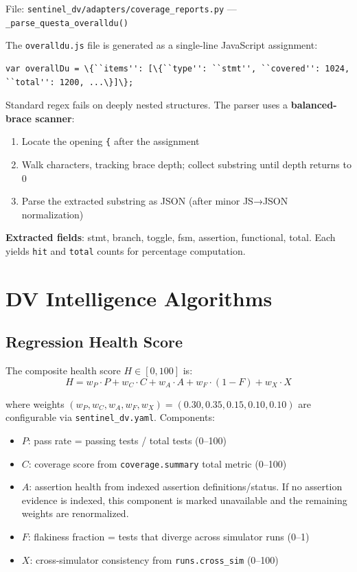 \documentclass[11pt,a4paper]{article}
\begin{document}
File: \texttt{sentinel\_dv/adapters/coverage\_reports.py} — \texttt{\_parse\_questa\_overalldu()}

The \texttt{overalldu.js} file is generated as a single-line JavaScript assignment:
\begin{lstlisting}[style=yaml,numbers=none,xleftmargin=0em]
var overallDu = \{``items'': [\{``type'': ``stmt'', ``covered'': 1024, ``total'': 1200, ...\}]\};
\end{lstlisting}

Standard regex fails on deeply nested structures. The parser uses a
\textbf{balanced-brace scanner}:
\begin{enumerate}
  \item Locate the opening \texttt{\{} after the assignment
  \item Walk characters, tracking brace depth; collect substring until depth returns to 0
  \item Parse the extracted substring as JSON (after minor JS→JSON normalization)
\end{enumerate}

\textbf{Extracted fields}: stmt, branch, toggle, fsm, assertion, functional, total.
Each yields \texttt{hit} and \texttt{total} counts for percentage computation.

\section{DV Intelligence Algorithms}

\subsection{Regression Health Score}

The composite health score $H \in [0, 100]$ is:
\[
H = w_P \cdot P + w_C \cdot C + w_A \cdot A + w_F \cdot (1 - F) + w_X \cdot X
\]

where weights $(w_P, w_C, w_A, w_F, w_X) = (0.30, 0.35, 0.15, 0.10, 0.10)$ are
configurable via \texttt{sentinel\_dv.yaml}. Components:
\begin{itemize}
  \item $P$: pass rate = passing tests / total tests (0--100)
  \item $C$: coverage score from \texttt{coverage.summary} total metric (0--100)
  \item $A$: assertion health from indexed assertion definitions/status. If no
        assertion evidence is indexed, this component is marked unavailable and
        the remaining weights are renormalized.
  \item $F$: flakiness fraction = tests that diverge across simulator runs (0--1)
  \item $X$: cross-simulator consistency from \texttt{runs.cross\_sim} (0--100)
\end{itemize}
\end{document}
